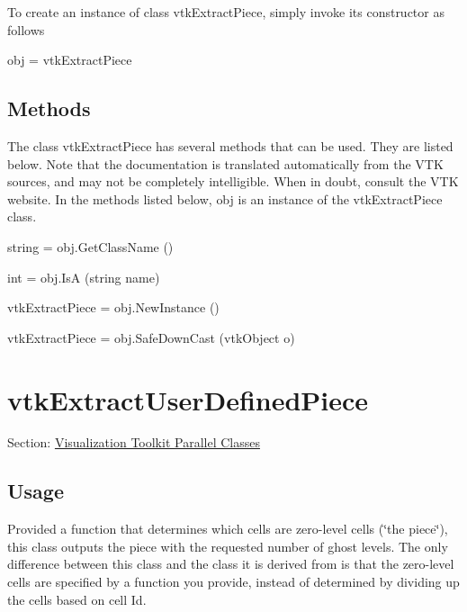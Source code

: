 To create an instance of class vtk\-Extract\-Piece, simply invoke its constructor as follows \begin{DoxyVerb}  obj = vtkExtractPiece
\end{DoxyVerb}
 \hypertarget{vtkwidgets_vtkxyplotwidget_Methods}{}\subsection{Methods}\label{vtkwidgets_vtkxyplotwidget_Methods}
The class vtk\-Extract\-Piece has several methods that can be used. They are listed below. Note that the documentation is translated automatically from the V\-T\-K sources, and may not be completely intelligible. When in doubt, consult the V\-T\-K website. In the methods listed below, {\ttfamily obj} is an instance of the vtk\-Extract\-Piece class. 
\begin{DoxyItemize}
\item {\ttfamily string = obj.\-Get\-Class\-Name ()}  
\item {\ttfamily int = obj.\-Is\-A (string name)}  
\item {\ttfamily vtk\-Extract\-Piece = obj.\-New\-Instance ()}  
\item {\ttfamily vtk\-Extract\-Piece = obj.\-Safe\-Down\-Cast (vtk\-Object o)}  
\end{DoxyItemize}\hypertarget{vtkparallel_vtkextractuserdefinedpiece}{}\section{vtk\-Extract\-User\-Defined\-Piece}\label{vtkparallel_vtkextractuserdefinedpiece}
Section\-: \hyperlink{sec_vtkparallel}{Visualization Toolkit Parallel Classes} \hypertarget{vtkwidgets_vtkxyplotwidget_Usage}{}\subsection{Usage}\label{vtkwidgets_vtkxyplotwidget_Usage}
Provided a function that determines which cells are zero-\/level cells (\char`\"{}the piece\char`\"{}), this class outputs the piece with the requested number of ghost levels. The only difference between this class and the class it is derived from is that the zero-\/level cells are specified by a function you provide, instead of determined by dividing up the cells based on cell Id.

